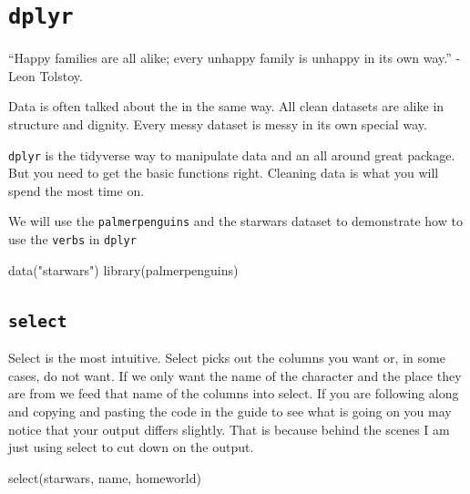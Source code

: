 \documentclass[
  letterpaper,
  DIV=11,
  numbers=noendperiod,
  oneside]{scrreprt}
\newenvironment{Shaded}{\begin{snugshade}}{\end{snugshade}}
\newcommand{\FunctionTok}[1]{\textcolor[rgb]{0.28,0.35,0.67}{#1}}
\newcommand{\NormalTok}[1]{\textcolor[rgb]{0.00,0.23,0.31}{#1}}
\newcommand{\StringTok}[1]{\textcolor[rgb]{0.13,0.47,0.30}{#1}}
\begin{document}
\hypertarget{dplyr}{%
\section{\texorpdfstring{\texttt{dplyr}}{dplyr}}\label{dplyr}}

\begin{tcolorbox}[enhanced jigsaw, breakable, colback=white, left=2mm, bottomrule=.15mm, opacityback=0, toprule=.15mm, arc=.35mm, rightrule=.15mm, leftrule=.75mm]

``Happy families are all alike; every unhappy family is unhappy in its
own way.'' - Leon Tolstoy.

\end{tcolorbox}

Data is often talked about the in the same way. All clean datasets are
alike in structure and dignity. Every messy dataset is messy in its own
special way.

\texttt{dplyr} is the tidyverse way to manipulate data and an all around
great package. But you need to get the basic functions right. Cleaning
data is what you will spend the most time on.

We will use the \texttt{palmerpenguins} and the starwars dataset to
demonstrate how to use the \texttt{verbs} in \texttt{dplyr}

\begin{Shaded}
\begin{Highlighting}[]
\FunctionTok{data}\NormalTok{(}\StringTok{"starwars"}\NormalTok{)}
\FunctionTok{library}\NormalTok{(palmerpenguins)}
\end{Highlighting}
\end{Shaded}

\hypertarget{select}{%
\subsection{\texorpdfstring{\texttt{select}}{select}}\label{select}}

Select is the most intuitive. Select picks out the columns you want or,
in some cases, do not want. If we only want the name of the character
and the place they are from we feed that name of the columns into
select. If you are following along and copying and pasting the code in
the guide to see what is going on you may notice that your output
differs slightly. That is because behind the scenes I am just using
select to cut down on the output.

\begin{Shaded}
\begin{Highlighting}[]
\FunctionTok{select}\NormalTok{(starwars, name, homeworld)}
\end{Highlighting}
\end{Shaded}
\end{document}
